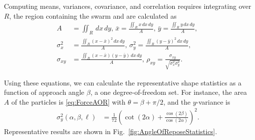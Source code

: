 Computing means, variances, covariance, and correlation requires integrating over $R$, the region containing the swarm and are calculated as%
%
\begin{align}
A &=\iint_R \,dx\,dy \text{, }
\bar{x} =\frac{\iint_R x \,dx\,dy}{A} \label{eq:meanInSquareWorkspace}
\text{, } \bar{y}=\frac{\iint_R y \,dx\,dy}{A} \text{, }\\
\sigma^2_x &=\frac{\iint_R \left(x-\bar{x}\right)^2  \,dx \,dy}{A}  \label{eq:varInSquareWorkspace}
\text{, } \sigma^2_y =\frac{\iint_R  \left(y-\bar{y}\right)^2 \,dx \,dy}{A}  \text{, }\\
\sigma_{xy} &= \frac{\iint_R  \left(x-\bar{x}\right) \left(y-\bar{y}\right) \, dx \,dy}{A} \label{eq:covAndcorrInSquareWorkspace}
\text{, }\rho_{xy} = \frac{\sigma_{xy}}{\sqrt{\sigma^2_x\sigma^2_y}}.
\end{align}

Using these equations, we can calculate the representative shape statistics as a function of approach angle $\beta$, a one degree-of-freedom set. 
For instance, the area $A$ of the particles is \eqref{eq:ForceAOR} with $\theta = \beta + \pi/2$, and the $y$-variance is
\begin{align}
\sigma_y^2(\alpha, \beta,\ell) &= \frac{1}{72}   \left( \cot(2\alpha) + \frac{\cos(2\beta)}{ \cos(2\alpha)} \right)^2.
\end{align}
Representative results are shown in Fig.~\ref{fig:AngleOfReposeStatistics}.




